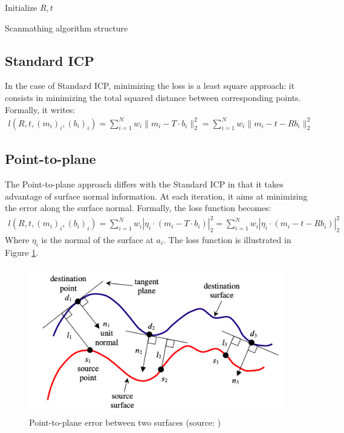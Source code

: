 \documentclass[11pt,letterpaper,leqno]{article}
\begin{document}
\begin{algorithm}[H]
    \SetAlgoLined
     Initialize $R,t$\;
    \caption{Scanmathing algorithm structure}
    \label{algo}
\end{algorithm}


\subsection{Standard ICP}

In the case of Standard ICP, minimizing the loss is a least square approach: it consists in minimizing the total squared distance between corresponding points. Formally, it writes:
\begin{align*}
    l(R,t, (m_i)_i, (b_i)_i) = \sum_{i=1}^N w_i \|m_i - T \cdot b_i\|_2^2 = \sum_{i=1}^N w_i \|m_i - t - R b_i\|_2^2
\end{align*}
\subsection{Point-to-plane}
The Point-to-plane approach differs with the Standard ICP in that it takes advantage of surface normal information. At each iteration, it aims at minimizing the error along the surface normal. Formally, the loss function becomes:
\begin{align*}
    l(R,t, (m_i)_i, (b_i)_i) = \sum_{i=1}^N w_i |\eta_i \cdot (m_i - T \cdot b_i)|_2^2 = \sum_{i=1}^N w_i |\eta_i \cdot (m_i - t - R b_i)|_2^2
\end{align*}
Where $\eta_i$ is the normal of the surface at $a_i$. The loss function is illustrated in Figure \ref{fig:point2plane}.
\begin{figure}[ht!]
    \centering
    \includegraphics[width=0.7\linewidth]{img/point2plane.png}
    \caption{Point-to-plane error between two surfaces (source: \cite{point2plane})}
    \label{fig:point2plane}
\end{figure}
\end{document}
